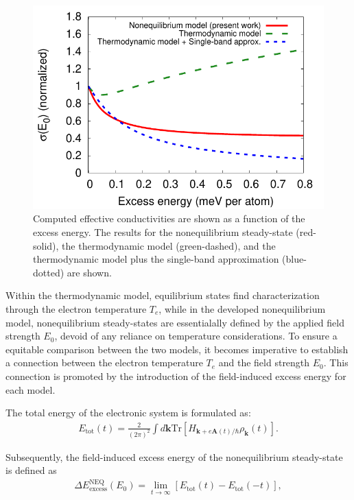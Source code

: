 \begin{figure}[htbp]
	\centering
	\includegraphics[width=0.8\linewidth]{pic/sigma_thermo.pdf}
	\caption{\label{fig:compare} Computed effective conductivities are shown as a function of the excess energy. The results for the nonequilibrium steady-state (red-solid), the thermodynamic model (green-dashed), and the thermodynamic model plus the single-band approximation (blue-dotted) are shown.}
\end{figure}

Within the thermodynamic model, equilibrium states find characterization through the electron
temperature $T_e$, while in the developed nonequilibrium model, nonequilibrium steady-states are
essentialally defined by the applied field strength $E_0$, devoid of any reliance on temperature
considerations. To ensure a equitable comparison between the two models, it becomes imperative to
establish a connection between the electron temperature $T_e$ and the field strength $E_0$. This connection is promoted by the introduction of the field-induced excess energy for each model.

The total energy of the electronic system is formulated as:
\begin{eqnarray}
	E_{\mathrm{tot}}(t)=\frac{2}{(2\pi)^2} \int d\mathbf k \mathrm{Tr}\left[H_{\mathbf k+ e\mathbf A(t)/\hbar} \rho_{\mathbf k}(t)\right].
	\label{eqn:totalenergy}
\end{eqnarray}

Subsequently, the field-induced excess energy of the nonequilibrium steady-state is defined as
\begin{eqnarray}
	\Delta E^\mathrm{NEQ}_{\mathrm{excess}}(E_0)=\lim_{t\rightarrow \infty} \left [E_{\mathrm{tot}}(t)
	-E_{\mathrm{tot}}(-t) \right ],
	\label{eq:excess-energy-neq}
\end{eqnarray}

